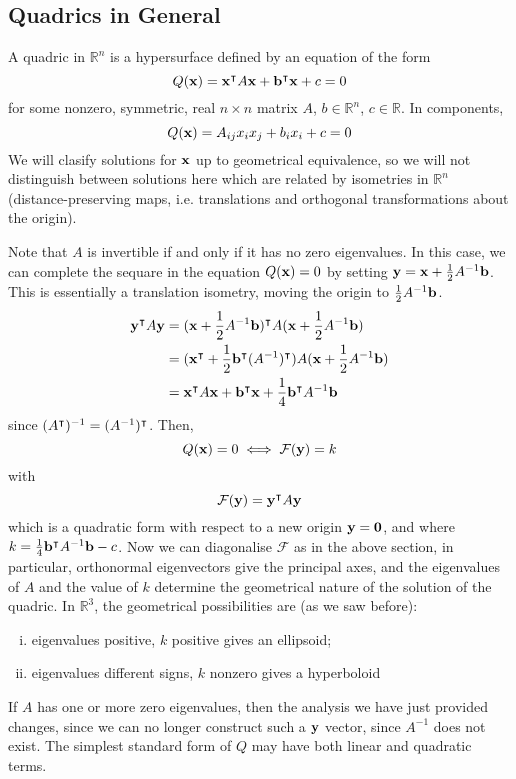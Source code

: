 \subsection{Quadrics in General}
A quadric in \(\mathbb R^n\) is a hypersurface defined by an equation of the form
\[ Q(\vb x) = \vb x^\intercal A \vb x + \vb b^\intercal \vb x + c = 0 \]
for some nonzero, symmetric, real \(n \times n\) matrix \(A\), \(b \in \mathbb R^n\), \(c \in \mathbb R\). In components,
\[ Q(\vb x) = A_{ij}x_ix_j + b_ix_i + c = 0 \]
We will clasify solutions for \(\vb x\) up to geometrical equivalence, so we will not distinguish between solutions here which are related by isometries in \(\mathbb R^n\) (distance-preserving maps, i.e. translations and orthogonal transformations about the origin).

Note that \(A\) is invertible if and only if it has no zero eigenvalues. In this case, we can complete the sequare in the equation \(Q(\vb x) = 0\) by setting \(\vb y = \vb x + \frac{1}{2}A^{-1} \vb b\). This is essentially a translation isometry, moving the origin to \(\frac{1}{2}A^{-1} \vb b\).
\begin{align*}
	\vb y^\intercal A \vb y & = (\vb x + \frac{1}{2}A^{-1}\vb b)^\intercal A (\vb x + \frac{1}{2}A^{-1}\vb b)                         \\
	                         & = (\vb x^\intercal + \frac{1}{2}\vb b^\intercal(A^{-1})^\intercal) A (\vb x + \frac{1}{2}A^{-1}\vb b) \\
	                         & = \vb x^\intercal A \vb x + \vb b^\intercal \vb x + \frac{1}{4}\vb b^\intercal A^{-1}\vb b
\end{align*}
since \((A^\intercal)^{-1} = (A^{-1})^\intercal\). Then,
\[ Q(\vb x) = 0 \iff \mathcal F(\vb y) = k \]
with
\[ \mathcal F(\vb y) = \vb y^\intercal A \vb y \]
which is a quadratic form with respect to a new origin \(\vb y = \vb 0\), and where \(k = \frac{1}{4}\vb b^\intercal A^{-1}\vb b - c\). Now we can diagonalise \(\mathcal F\) as in the above section, in particular, orthonormal eigenvectors give the principal axes, and the eigenvalues of \(A\) and the value of \(k\) determine the geometrical nature of the solution of the quadric. In \(\mathbb R^3\), the geometrical possibilities are (as we saw before):
\begin{enumerate}[(i)]
	\item eigenvalues positive, \(k\) positive gives an ellipsoid;
	\item eigenvalues different signs, \(k\) nonzero gives a hyperboloid
\end{enumerate}
If \(A\) has one or more zero eigenvalues, then the analysis we have just provided changes, since we can no longer construct such a \(\vb y\) vector, since \(A^{-1}\) does not exist. The simplest standard form of \(Q\) may have both linear and quadratic terms.

